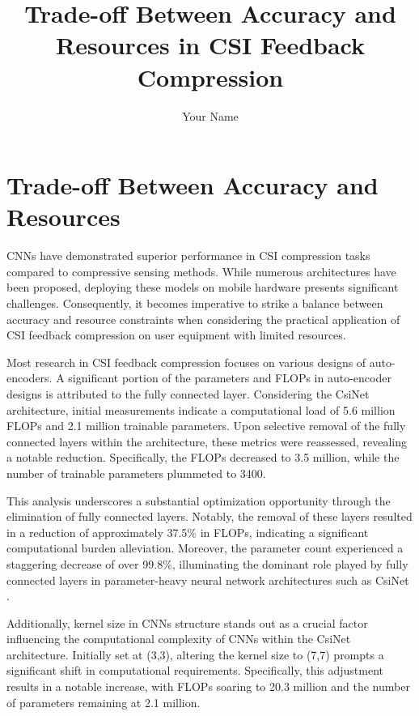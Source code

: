 \documentclass[lettersize,journal]{IEEEtran}
\title{Trade-off Between Accuracy and Resources in CSI Feedback Compression}
\author{Your Name}
\begin{document}
\maketitle

\section{Trade-off Between Accuracy and Resources} 

CNNs have demonstrated superior performance in CSI compression tasks compared to compressive sensing methods. While numerous architectures have been proposed, deploying these models on mobile hardware presents significant challenges. Consequently, it becomes imperative to strike a balance between accuracy and resource constraints when considering the practical application of CSI feedback compression on user equipment with limited resources.

Most research in CSI feedback compression focuses on various designs of auto-encoders. A significant portion of the parameters and FLOPs in auto-encoder designs is attributed to the fully connected layer. Considering the CsiNet \cite{abe} architecture, initial measurements indicate a computational load of 5.6 million FLOPs and 2.1 million trainable parameters. Upon selective removal of the fully connected layers within the architecture, these metrics were reassessed, revealing a notable reduction. Specifically, the FLOPs decreased to 3.5 million, while the number of trainable parameters plummeted to 3400.

This analysis underscores a substantial optimization opportunity through the elimination of fully connected layers. Notably, the removal of these layers resulted in a reduction of approximately 37.5\% in FLOPs, indicating a significant computational burden alleviation. Moreover, the parameter count experienced a staggering decrease of over 99.8\%, illuminating the dominant role played by fully connected layers in parameter-heavy neural network architectures such as CsiNet \cite{abe}.

Additionally, kernel size in CNNs structure stands out as a crucial factor influencing the computational complexity of CNNs within the CsiNet \cite{abe} architecture. Initially set at (3,3), altering the kernel size to (7,7) prompts a significant shift in computational requirements. Specifically, this adjustment results in a notable increase, with FLOPs soaring to 20.3 million and the number of parameters remaining at 2.1 million.
\end{document}
